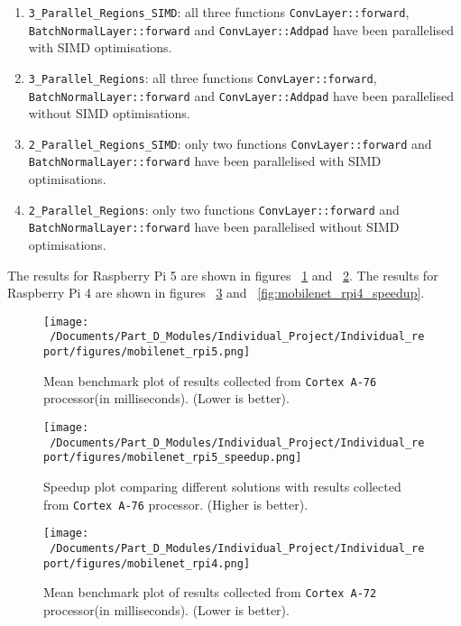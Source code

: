 \begin{enumerate}
	\item \texttt{3\_Parallel\_Regions\_SIMD}: all three functions \texttt{ConvLayer::forward}, \texttt{BatchNormalLayer::forward} and \texttt{ConvLayer::Addpad} have been parallelised with SIMD optimisations.
	\item \texttt{3\_Parallel\_Regions}: all three functions \texttt{ConvLayer::forward}, \texttt{BatchNormalLayer::forward} and \texttt{ConvLayer::Addpad} have been parallelised without SIMD optimisations.
	\item \texttt{2\_Parallel\_Regions\_SIMD}: only two functions \texttt{ConvLayer::forward} and \texttt{BatchNormalLayer::forward} have been parallelised with SIMD optimisations.
	\item \texttt{2\_Parallel\_Regions}: only two functions \texttt{ConvLayer::forward} and \texttt{BatchNormalLayer::forward} have been parallelised without SIMD optimisations.
\end{enumerate}

The results for Raspberry Pi 5 are shown in figures ~\ref{fig:mobilenet_rpi5_plot} and ~\ref{fig:mobilenet_rpi5_speedup}. The results for Raspberry Pi 4 are shown in figures ~\ref{fig:mobilenet_rpi4_plot} and ~\ref{fig:mobilenet_rpi4_speedup}. 

\begin{figure}[htbp] %
	\centering
	\texttt{[image: ~/Documents/Part\_D\_Modules/Individual\_Project/Individual\_report/figures/mobilenet\_rpi5.png]} %
	\caption{Mean benchmark plot of results collected from \texttt{Cortex A-76} processor(in milliseconds). (Lower is better).}
	\label{fig:mobilenet_rpi5_plot} %
\end{figure}

\begin{figure}[htbp] %
	\centering
	\texttt{[image: ~/Documents/Part\_D\_Modules/Individual\_Project/Individual\_report/figures/mobilenet\_rpi5\_speedup.png]} %
	\caption{Speedup plot comparing different solutions with results collected from \texttt{Cortex A-76} processor. (Higher is better).}
	\label{fig:mobilenet_rpi5_speedup} %
\end{figure}

\begin{figure}[htbp] %
	\centering
	\texttt{[image: ~/Documents/Part\_D\_Modules/Individual\_Project/Individual\_report/figures/mobilenet\_rpi4.png]} %
	\caption{Mean benchmark plot of results collected from \texttt{Cortex A-72} processor(in milliseconds). (Lower is better).}
	\label{fig:mobilenet_rpi4_plot} %
\end{figure}

